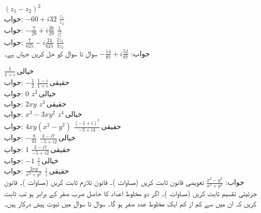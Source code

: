 \quad
$(z_1-z_2)^2$\\
جواب:\quad
$-60+i32$
\quad
$\tfrac{z_1}{z_2}$\\
جواب:\quad
$-\tfrac{7}{29}+i\tfrac{26}{29}$
\quad
$\tfrac{1}{z^2_1}$\\
جواب:\quad
$\tfrac{7}{625}-i\tfrac{24}{625}$
\quad
$\tfrac{2z_1}{3z_2}$\\
جواب:\quad
$-\tfrac{14}{87}+i\tfrac{52}{87}$
سوال  تا سوال  کو حل کریں جہاں  ہے۔

\quad
$\tfrac{1}{1+i}\,\text{خیالی}$\\
جواب:\quad
$-\tfrac{1}{2}$
\quad
$\tfrac{1-i}{1+i}\,\text{حقیقی}$\\
جواب:\quad
$0$
\quad
$z^2\,\text{خیالی}$\\
جواب:\quad
$2xy$
\quad
$z^3\,\text{حقیقی}$\\
جواب:\quad
$x^3-3xy^2$
\quad
$z^4\,\text{خیالی}$\\
جواب:\quad
$4xy(x^2-y^2)$
\quad
$\tfrac{(-1+i)^2}{-5+i4}\,\text{حقیقی}$\\
جواب:\quad
$-\tfrac{8}{41}$
\quad
$\tfrac{3-i7}{-5+i2}\,\text{خیالی}$\\
جواب:\quad
$1$
\quad
$\tfrac{3-i7}{-5+i2}\,\text{حقیقی}$\\
جواب:\quad
$-1$
\quad
$\tfrac{z}{\bar{z}}\,\text{خیالی}$\\
جواب:\quad
$\tfrac{2xy}{x^2+y^2}$
\quad
$\tfrac{z}{\bar{z}}\,\text{حقیقی}$\\
جواب:\quad
$\tfrac{x^2-y^2}{x^2+y^2}$
\quad
تعویضی قانون ثابت کریں (مساوات )۔
\quad
قانون تلازم ثابت کریں (مساوات )۔
\quad
قانون جزئیتی تقسیم ثابت کریں (مساوات )۔
\quad
اگر دو مخلوط اعداد کا حاصل ضرب صفر کے برابر ہو تب ثابت کریں کہ ان میں سے کم از کم ایک مخلوط عدد صفر ہو گا۔ 
سوال  تا سوال  میں ثبوت پیش درکار ہیں۔

